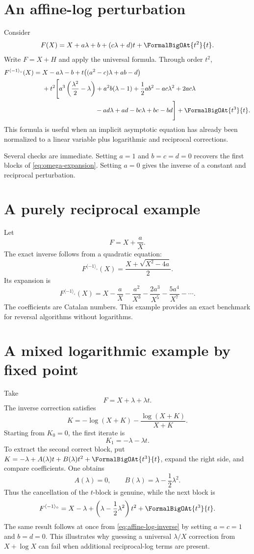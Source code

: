 \documentclass[11pt,openany]{book}
\theoremstyle{definition}
\theoremstyle{plain}
\theoremstyle{remark}
\newcommand{\invcomp}{^{\langle -1\rangle_{\circ}}}
\begin{document}
\section{An affine-log perturbation}
Consider
\begin{equation}\label{eq:affine-log-F}
 F(X)=X+a\lambda+b+(c\lambda+d)t+\FormalBigOAt{t^2}{t}.
\end{equation}
Write \(F=X+H\) and apply the universal formula. Through order \(t^2\),
\begin{align}
 F\invcomp(X)={}&X-a\lambda-b
 +t\bigl((a^2-c)\lambda+ab-d\bigr)\notag\\
 &+t^2\Bigg[
 a^3\left(\frac{\lambda^2}{2}-\lambda\right)
 +a^2b(\lambda-1)+\frac12ab^2
 -ac\lambda^2+2ac\lambda\notag\\
 &\hspace{2.9cm}-ad\lambda+ad-bc\lambda+bc-bd
 \Bigg]
 +\FormalBigOAt{t^3}{t}.
\label{eq:affine-log-inverse}
\end{align}
This formula is useful when an implicit asymptotic equation has already been normalized to a linear variable plus logarithmic and reciprocal corrections.

Several checks are immediate. Setting \(a=1\) and \(b=c=d=0\) recovers the first blocks of \cref{eq:omega-expansion}. Setting \(a=0\) gives the inverse of a constant and reciprocal perturbation.

\section{A purely reciprocal example}
Let
\[
 F=X+\frac{a}{X}.
\]
The exact inverse follows from a quadratic equation:
\[
 F\invcomp(X)=\frac{X+\sqrt{X^2-4a}}2.
\]
Its expansion is
\begin{equation}\label{eq:catalan-inverse}
 F\invcomp(X)
 =X-\frac aX-\frac{a^2}{X^3}-\frac{2a^3}{X^5}
 -\frac{5a^4}{X^7}-\cdots.
\end{equation}
The coefficients are Catalan numbers. This example provides an exact benchmark for reversal algorithms without logarithms.

\section{A mixed logarithmic example by fixed point}
Take
\[
 F=X+\lambda+\lambda t.
\]
The inverse correction satisfies
\[
 K=-\log(X+K)-\frac{\log(X+K)}{X+K}.
\]
Starting from \(K_0=0\), the first iterate is
\[
 K_1=-\lambda-\lambda t.
\]
To extract the second correct block, put \(K=-\lambda+A(\lambda)t+B(\lambda)t^2+\FormalBigOAt{t^3}{t}\), expand the right side, and compare coefficients. One obtains
\[
 A(\lambda)=0,
 \qquad
 B(\lambda)=\lambda-\frac12\lambda^2.
\]
Thus the cancellation of the \(t\)-block is genuine, while the next block is
\[
 F\invcomp
 =X-\lambda+\left(\lambda-\frac12\lambda^2\right)t^2+\FormalBigOAt{t^3}{t}.
\]
The same result follows at once from \cref{eq:affine-log-inverse} by setting \(a=c=1\) and \(b=d=0\). This illustrates why guessing a universal \(\lambda/X\) correction from \(X+\log X\) can fail when additional reciprocal-log terms are present.
\end{document}
